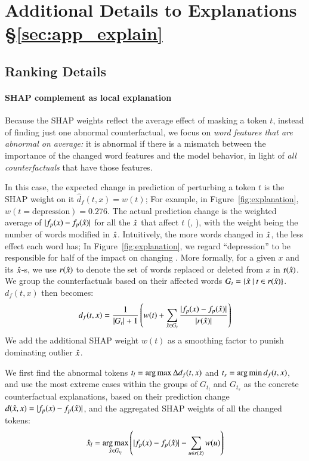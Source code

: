 \section{Additional Details to Explanations \S\ref{sec:app_explain}}
\label{appendix:explanation}


\subsection{Ranking Details}
\label{appendix:exp_rank}

\paragraph{SHAP complement as local explanation}
Because the SHAP weights reflect the average effect of masking a token $t$, instead of finding just one abnormal counterfactual, we focus on \emph{word features that are abnormal on average:} 
it is abnormal if there is a mismatch between the importance of the changed word features and the model behavior, in light of \emph{all counterfactuals} that have those features.

In this case, the expected change in prediction of perturbing a token $t$ is the SHAP weight on it $\hat{d}_f(t, x) = w(t)$; 
For example, in Figure~\ref{fig:explanation}, $w(t=\text{{depression}})=0.276$.
The actual prediction change is the weighted average of $|f_p(x)-f_p(\hat{x})|$ for all the $\hat{x}$ that affect $t$ (, ), with the weight being the number of words modified in $\hat{x}$. 
Intuitively, the more words changed in $\hat{x}$, the less effect each word has; In Figure~\ref{fig:explanation}, we regard ``depression'' to be responsible for half of the impact on changing .
More formally, for a given $x$ and its $\hat{x}$-s, we use $r(\hat{x})$ to denote the set of words replaced or deleted from $x$ in $\operatorname*{r}(\hat{x})$.
We group the counterfactuals based on their affected words $G_t = \{\hat{x}\ |\ t \in r(\hat{x})\}$. $d_f(t, x)$ then becomes:
$$d_f(t, x) = \frac{1}{|G_t|+1} \left(w(t) + \sum_{\hat{x} \in G_t} \frac{|f_p(x)-f_p(\hat{x})|}{|r(\hat{x})|}\right)$$
We add the additional SHAP weight $w(t)$ as a smoothing factor to punish dominating outlier $\hat{x}$.

We first find the abnormal tokens $t_l = \operatorname*{arg\,max} \Delta d_f(t, x)$ and $t_s = \operatorname*{arg\,min} d_f(t, x)$, and use the most extreme cases within the groups of $G_{t_l}$ and $G_{t_s}$ as the concrete counterfactual explanations, based on their prediction change $d(\hat{x}, x) = |f_p(x)-f_p(\hat{x})|$, and the aggregated SHAP weights of all the changed tokens:
$$\hat{x}_l = \operatorname*{arg\,max}_{\hat{x} \in G_{t_l}} \left( |f_p(x)-f_p(\hat{x})| - \sum_{u\in r(\hat{x})} w(u) \right)$$ 



